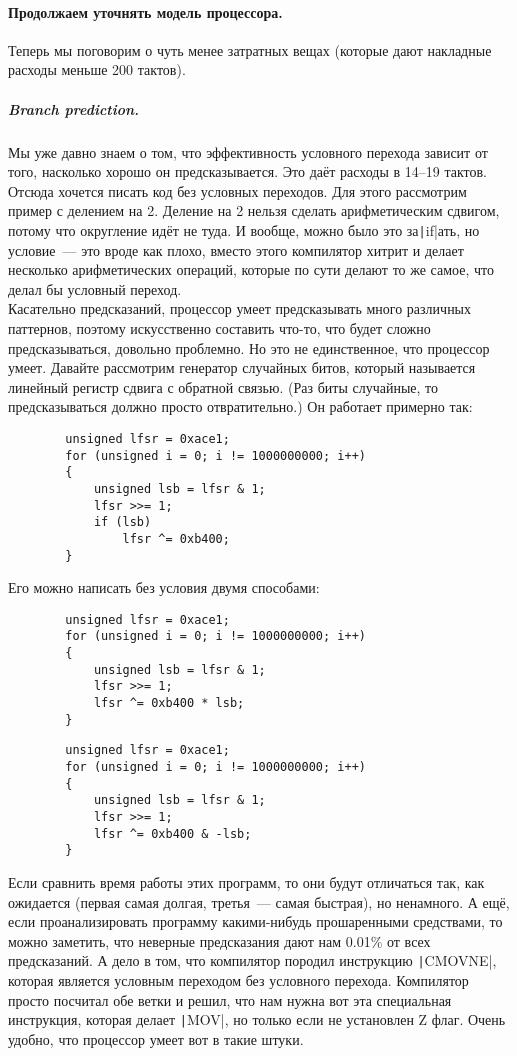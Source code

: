 \documentclass{article}
\begin{document}
    \paragraph{Продолжаем уточнять модель процессора.}
    Теперь мы поговорим о чуть менее затратных вещах (которые дают накладные расходы меньше 200 тактов).
    \subparagraph{Branch prediction.}
    Мы уже давно знаем о том, что эффективность условного перехода зависит от того, насколько хорошо он предсказывается. Это даёт расходы в 14--19 тактов. Отсюда хочется писать код без условных переходов. Для этого рассмотрим пример с делением на 2. Деление на 2 нельзя сделать арифметическим сдвигом, потому что округление идёт не туда. И вообще, можно было это за\texttt|if|ать, но условие~--- это вроде как плохо, вместо этого компилятор хитрит и делает несколько арифметических операций, которые по сути делают то же самое, что делал бы условный переход.\\
    Касательно предсказаний, процессор умеет предсказывать много различных паттернов, поэтому искусственно составить что-то, что будет сложно предсказываться, довольно проблемно. Но это не единственное, что процессор умеет. Давайте рассмотрим генератор случайных битов, который называется линейный регистр сдвига с обратной связью. (Раз биты случайные, то предсказываться должно просто отвратительно.) Он работает примерно так:
    \begin{verbatim}
        unsigned lfsr = 0xace1;
        for (unsigned i = 0; i != 1000000000; i++)
        {
            unsigned lsb = lfsr & 1;
            lfsr >>= 1;
            if (lsb)
                lfsr ^= 0xb400;
        }
    \end{verbatim}
    Его можно написать без условия двумя способами:
    \begin{multicols}{2}
    \begin{verbatim}
        unsigned lfsr = 0xace1;
        for (unsigned i = 0; i != 1000000000; i++)
        {
            unsigned lsb = lfsr & 1;
            lfsr >>= 1;
            lfsr ^= 0xb400 * lsb;
        }
    \end{verbatim}
    \columnbreak
    \begin{verbatim}
        unsigned lfsr = 0xace1;
        for (unsigned i = 0; i != 1000000000; i++)
        {
            unsigned lsb = lfsr & 1;
            lfsr >>= 1;
            lfsr ^= 0xb400 & -lsb;
        }
    \end{verbatim}
    \end{multicols}
    Если сравнить время работы этих программ, то они будут отличаться так, как ожидается (первая самая долгая, третья~--- самая быстрая), но ненамного. А ещё, если проанализировать программу какими-нибудь прошаренными средствами, то можно заметить, что неверные предсказания дают нам 0.01\% от всех предсказаний. А дело в том, что компилятор породил инструкцию \texttt|CMOVNE|, которая является условным переходом без условного перехода. Компилятор просто посчитал обе ветки и решил, что нам нужна вот эта специальная инструкция, которая делает \texttt|MOV|, но только если не установлен Z флаг. Очень удобно, что процессор умеет вот в такие штуки.\\
\end{document}

